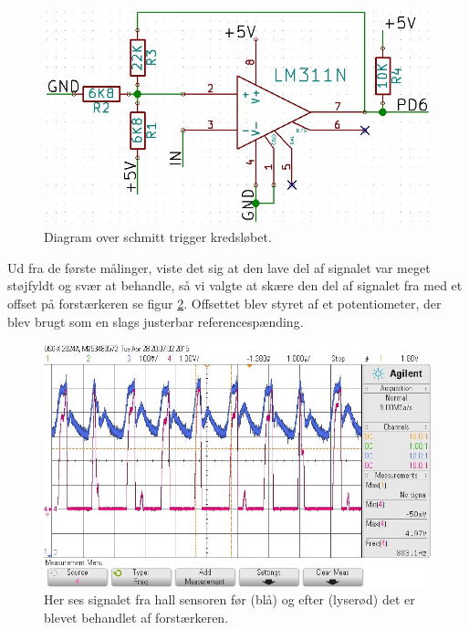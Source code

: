 \begin{figure}[h]

	\centering
		\includegraphics[scale=0.3]{Billeder/Schmitt.jpg}
	\caption{Diagram over schmitt trigger kredsløbet.}
	\label{fig:Schmitt}
	
\end{figure}

Ud fra de første målinger, viste det sig at den lave del af signalet var meget støjfyldt og svær at behandle, så vi valgte at skære den del af signalet fra med et offset på forstærkeren se figur \ref{fig:Signal1}. Offsettet blev styret af et potentiometer, der blev brugt som en slags justerbar referencespænding.

\begin{figure}[h]

	\centering
		\includegraphics[scale=0.4]{Billeder/Signal1.jpg}
	\caption{Her ses signalet fra hall sensoren før (blå) og efter (lyserød) det er blevet behandlet af forstærkeren.}
	\label{fig:Signal1}
	
\end{figure}

